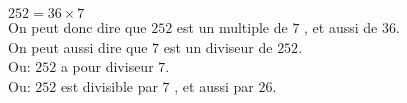 
$252=36 \times 7$\\
On peut donc dire que $252$ est un multiple de $7$ , et aussi de $36$.\\
On peut aussi dire que $7$ est un diviseur de $252$.\\
Ou: $252$ a pour diviseur $7$.\\
Ou: $252$ est divisible par $7$ , et aussi par $26$.